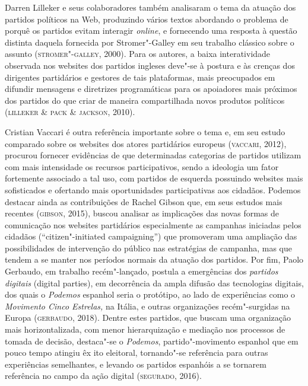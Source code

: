 Darren Lilleker e seus colaboradores também analisaram o tema da atuação
dos partidos políticos na Web, produzindo vários textos abordando o
problema de porquê os partidos evitam interagir \emph{online}, e fornecendo uma
resposta à questão distinta daquela fornecida por Stromer"-Galley em seu
trabalho clássico sobre o assunto (\textsc{stromer"-galley}, 2000). Para os
autores, a baixa interatividade observada nos websites dos partidos
ingleses deve"-se à postura e às crenças dos dirigentes partidários e
gestores de tais plataformas, mais preocupados em difundir mensagens e
diretrizes programáticas para os apoiadores mais próximos dos partidos
do que criar de maneira compartilhada novos produtos políticos (\textsc{lilleker}
\& \textsc{pack} \& \textsc{jackson}, 2010).

Cristian Vaccari é outra referência importante sobre o tema e, em seu
estudo comparado sobre os websites dos atores partidários europeus
(\textsc{vaccari}, 2012), procurou fornecer evidências de que determinadas
categorias de partidos utilizam com mais intensidade os recursos
participativos, sendo a ideologia um fator fortemente associado a tal
uso, com partidos de esquerda possuindo websites mais sofisticados e
ofertando mais oportunidades participativas aos cidadãos. Podemos
destacar ainda as contribuições de Rachel Gibson que, em seus estudos
mais recentes (\textsc{gibson}, 2015), buscou analisar as implicações das novas
formas de comunicação nos websites partidários especialmente as
campanhas iniciadas pelos cidadãos (``citizen"-initiated campaigning'')
que promoveram uma ampliação das possibilidades de intervenção do
público nas estratégias de campanha, mas que tendem a se manter nos
períodos normais da atuação dos partidos. Por fim, Paolo Gerbaudo, em
trabalho recém"-lançado, postula a emergências dos \emph{partidos
digitais} (digital parties), em decorrência da ampla difusão das
tecnologias digitais, dos quais o \emph{Podemos} espanhol seria o
protótipo, ao lado de experiências como o \emph{Movimento Cinco
Estrelas,} na Itália, e outras organizações recém"-surgidas na Europa
(\textsc{gerbaudo}, 2018). Dentre estes partidos, que buscam uma organização mais
horizontalizada, com menor hierarquização e mediação nos processos de
tomada de decisão, destaca"-se o \emph{Podemos}, partido"-movimento espanhol que
em pouco tempo atingiu êx ito eleitoral, tornando"-se referência para
outras experiências semelhantes, e levando os partidos espanhóis a se
tornarem referência no campo da ação digital (\textsc{segurado}, 2016).

